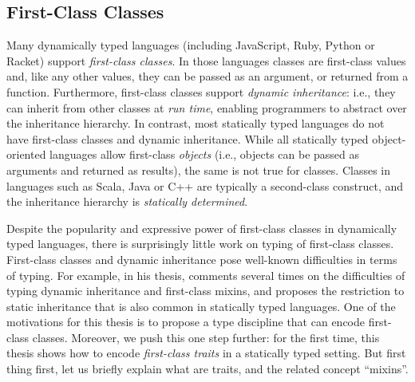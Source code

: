 \subsection{First-Class Classes}

Many dynamically typed languages (including JavaScript, Ruby, Python or Racket)
support \emph{first-class classes}. In those languages classes are first-class
values and, like any other values, they can be passed as an argument, or
returned from a function. Furthermore, first-class classes support \emph{dynamic inheritance}:
i.e., they can inherit from other classes at \emph{run time},
enabling programmers to abstract over the inheritance hierarchy. %
In contrast, most statically typed languages do not have first-class classes and
dynamic inheritance. While all statically typed object-oriented languages allow first-class
\emph{objects} (i.e., objects can be passed as arguments and returned as
results), the same is not true for classes. Classes in languages such as Scala,
Java or C++ are typically a second-class construct, and the inheritance
hierarchy is \emph{statically determined}.

Despite the popularity and expressive power of first-class classes in
dynamically typed languages, there is surprisingly little work on typing of
first-class classes. First-class classes and dynamic inheritance pose well-known
difficulties in terms of typing. For example, in his thesis,
\citet{bracha1992programming} comments several times on the difficulties of
typing dynamic inheritance and first-class mixins, and proposes the restriction
to static inheritance that is also common in statically typed languages. One of
the motivations for this thesis is to propose a type discipline that can encode
first-class classes. Moreover, we push this one step further: for the first
time, this thesis shows how to encode \emph{first-class traits} in a
statically typed setting. But first thing first, let us briefly explain what are
traits, and the related concept ``mixins''.



